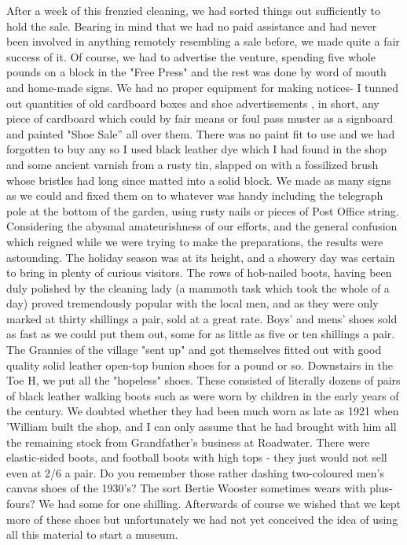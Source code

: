 After a week of this frenzied cleaning, we had sorted things out sufficiently to hold the sale. Bearing in mind that we had no paid assistance and had never been involved in anything remotely resembling a sale before, we made quite a fair success of it. Of course, we had to advertise the venture, spending five whole pounds on a block in the "Free Press" and the rest was done by word of mouth and home-made signs. We had no proper equipment for making notices- I tunned out quantities of old cardboard boxes and shoe advertisements , in short, any piece of cardboard which could by fair means or foul pass muster as a signboard and painted "Shoe Sale” all over them. There was no paint fit to use and we had forgotten to buy any so I used black leather dye which I had found in the shop and some ancient varnish from a rusty tin, slapped on with a fossilized brush whose bristles had long since matted into a solid block. We made as many signs as we could and fixed them on to whatever was handy including the telegraph pole at the bottom of the garden, using rusty nails or pieces of Post Office string. Considering the abysmal amateurishness of our efforts, and the general confusion which reigned while we were trying to make the preparations, the results were astounding. The holiday season was at its height, and a showery day was certain to bring in plenty of curious visitors. The rows of hob-nailed boots, having been duly polished by the cleaning lady (a mammoth task which took the whole of a day) proved tremendously popular with the local men, and as they were only marked at thirty shillings a pair, sold at a great rate. Boys' and mens' shoes sold as fast as we could put them out, some for as little as five or ten shillings a pair. The Grannies of the village "sent up" and got themselves fitted out with good quality solid leather open-top bunion shoes for a pound or so. Downstairs in the Toe H, we put all the "hopeless" shoes. These consisted of literally dozens of pairs of black leather walking boots such as were worn by children in the early years of the century. We doubted whether they had been much worn as late as 1921 when 'William built the shop, and I can only assume that he had brought with him all the remaining stock from Grandfather's business at Roadwater. There were elastic-sided boots, and football boots with high tops - they just would not sell even at 2/6 a pair. Do you remember those rather dashing two-coloured men's canvas shoes of the 1930's? The sort Bertie Wooster sometimes wears with plus-fours? We had some for one shilling. Afterwards of course we wished that we kept more of these shoes but unfortunately we had not yet conceived the idea of using all this material to start a museum.

